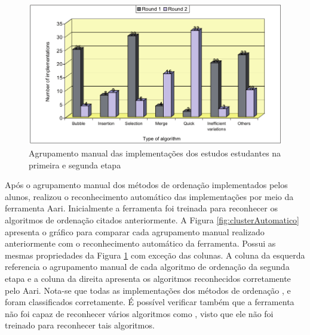 	    \begin{figure}[h]
	        \centering
	        \includegraphics[scale=0.4]{imagem/clusterManual.png}
	        \captionsetup{justification=centering}
	        \caption{Agrupamento manual das implementações dos estudos estudantes na
	        	primeira e segunda etapa}
	        \label{fig:clusterManual}
	    \end{figure}
	    
	    Após o agrupamento manual dos métodos de ordenação implementados pelos alunos,
	     realizou o reconhecimento automático das
	    implementações por meio da ferramenta Aari. Inicialmente a ferramenta foi
	    treinada para reconhecer os algoritmos de ordenação citados anteriormente.
	    A Figura \ref{fig:clusterAutomatico} apresenta o gráfico para comparar cada
	    agrupamento manual realizado anteriormente com o reconhecimento automático
	    da ferramenta. Possui as mesmas propriedades da Figura \ref{fig:clusterManual}
	    com exceção das colunas. A coluna da esquerda referencia o agrupamento manual
	    de cada algoritmo de ordenação da segunda etapa e a coluna da direita apresenta
	    os algoritmos reconhecidos corretamente pelo Aari. Nota-se que todas as
	    implementações dos métodos de ordenação ,
	     e  foram classificados corretamente.
	    É possível verificar também que a ferramenta não foi capaz de reconhecer vários
	    algoritmos como , visto que ele não foi treinado para
	    reconhecer tais algoritmos.
	    
